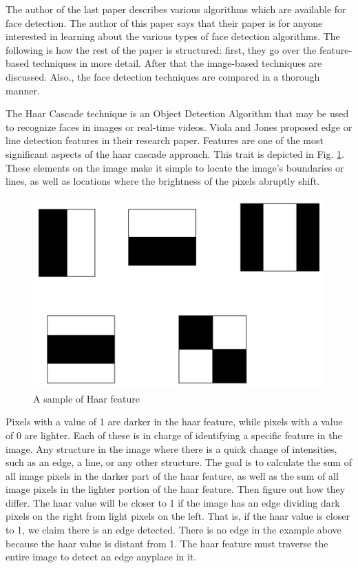 \documentclass[journal]{IEEEtran}
\begin{document}
The author of the last paper describes various algorithms which
are available for face detection. The author of this paper says
that their paper is for anyone interested in learning about
the various types of face detection algorithms. The following
is how the rest of the paper is structured: first, they go
over the feature-based techniques in more detail. After that
the image-based techniques are discussed. Also., the face
detection techniques are compared in a thorough manner.\cite{hasan2021human}

The Haar Cascade technique is an Object Detection Algorithm
that may be used to recognize faces in images or real-time
videos. Viola and Jones proposed edge or line detection
features in their research paper.\cite{viola2001rapid}
Features are one of the most significant aspects of the haar
cascade approach. This trait is depicted in Fig. \ref{haar_features}.
These elements on the image make it simple to locate the image's
boundaries or lines, as well as locations where the brightness
of the pixels abruptly shift.

\begin{figure}[!ht]
	\centering
	\includegraphics[width=\linewidth]{./img/HaarCascadeWorking.jpeg.png}
	\caption{A sample of Haar feature \cite{viola2001rapid}}
	\label{haar_features}
\end{figure}

Pixels with a value of 1 are darker in the haar feature,
while pixels with a value of 0 are lighter. Each of these
is in charge of identifying a specific feature in the image.
Any structure in the image where there is a quick change of
intensities, such as an edge, a line, or any other structure.
The goal is to calculate the sum of all image pixels in the
darker part of the haar feature, as well as the sum of all
image pixels in the lighter portion of the haar feature.
Then figure out how they differ. The haar value will be
closer to 1 if the image has an edge dividing dark pixels
on the right from light pixels on the left. That is, if the
haar value is closer to 1, we claim there is an edge detected.
There is no edge in the example above because the haar value
is distant from 1. The haar feature must traverse the entire
image to detect an edge anyplace in it.
\end{document}
